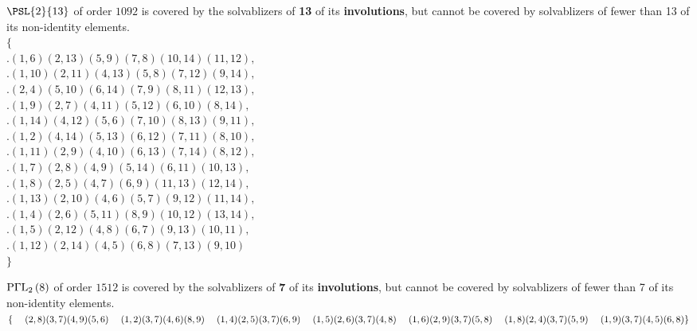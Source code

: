 \documentclass[12pt]{amsart}
\begin{document}
$\PSL{2}{13}$ of order $1092$ is covered by the solvablizers of \textbf{13}
of its \textbf{involutions}, but cannot be covered by solvablizers of
fewer than 13 of its non-identity elements. \\
{\tiny $\{$ \\
\phantom.\quad $(1,6)(2,13)(5,9)(7,8)(10,14)(11,12),$ \\
\phantom.\quad $(1,10)(2,11)(4,13)(5,8)(7,12)(9,14),$ \\
\phantom.\quad $(2,4)(5,10)(6,14)(7,9)(8,11)(12,13),$ \\
\phantom.\quad $(1,9)(2,7)(4,11)(5,12)(6,10)(8,14),$ \\
\phantom.\quad $(1,14)(4,12)(5,6)(7,10)(8,13)(9,11),$ \\
\phantom.\quad $(1,2)(4,14)(5,13)(6,12)(7,11)(8,10),$ \\
\phantom.\quad $(1,11)(2,9)(4,10)(6,13)(7,14)(8,12),$ \\
\phantom.\quad $(1,7)(2,8)(4,9)(5,14)(6,11)(10,13),$ \\
\phantom.\quad $(1,8)(2,5)(4,7)(6,9)(11,13)(12,14),$ \\
\phantom.\quad $(1,13)(2,10)(4,6)(5,7)(9,12)(11,14),$ \\
\phantom.\quad $(1,4)(2,6)(5,11)(8,9)(10,12)(13,14),$ \\
\phantom.\quad $(1,5)(2,12)(4,8)(6,7)(9,13)(10,11),$ \\
\phantom.\quad $(1,12)(2,14)(4,5)(6,8)(7,13)(9,10)$ \\
$\}$}

$\operatorname{P\Gamma{}L}_{2}\left(8\right)$ of order $1512$ is covered by the solvablizers of
\textbf{7} of its \textbf{involutions}, but cannot be covered by
solvablizers of fewer than 7 of its non-identity elements. \\
{\tiny $\{ \\
\phantom. \quad (2,8)(3,7)(4,9)(5,6) \\
\phantom. \quad (1,2)(3,7)(4,6)(8,9) \\
\phantom. \quad (1,4)(2,5)(3,7)(6,9) \\
\phantom. \quad (1,5)(2,6)(3,7)(4,8) \\
\phantom. \quad (1,6)(2,9)(3,7)(5,8) \\
\phantom. \quad (1,8)(2,4)(3,7)(5,9) \\
\phantom. \quad (1,9)(3,7)(4,5)(6,8) \\
\}$ }
\end{document}
